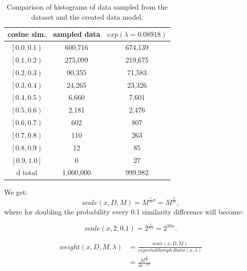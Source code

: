 \begin{table}[!ht]
    \centering
    \begin{tabular}{ c | c | c}
       cosine sim. & sampled data & $exp(\lambda=0.08918)$ \\
        \hline
        $\left[ 0.0, 0.1\right)$ & 600,716 & 674,139 \\
        $\left[ 0.1, 0.2\right)$ & 275,099 & 219,675 \\
        $\left[ 0.2, 0.3\right)$ & 90,355 & 71,583 \\
        $\left[ 0.3, 0.4\right)$ & 24,265 & 23,326 \\
        $\left[ 0.4, 0.5\right)$ & 6,660 & 7,601 \\
        $\left[ 0.5, 0.6\right)$ & 2,181 & 2,476 \\
        $\left[ 0.6, 0.7\right)$ & 602 & 807 \\
        $\left[ 0.7, 0.8\right)$ & 110 & 263 \\
        $\left[ 0.8, 0.9\right)$ & 12 & 85 \\
        $\left[ 0.9, 1.0\right]$ & 0 & 27 \\d
        total & 1,000,000 & 999,982
            
    \end{tabular}
    \caption{Comparison of histograms of data sampled from the dataset and the created data model.}
    \label{table:5.3_modeled_comparison}
\end{table}

We get:
\begin{equation}
    scale(x, D, M) = M^{\frac{1}{D}x} = M^{\frac{x}{D}},
\end{equation}
where for doubling the probability every 0.1 similarity difference will become:

\begin{equation}
    scale(x, 2, 0.1) = 2^{\frac{x}{0.1}} = 2^{10x}.
\end{equation}


\begin{equation}\label{eq:weight}
    \begin{aligned}
        weight(x, D, M, \lambda) &= \frac{scale(x, D, M)}{expectedSampleRatio(x, \lambda)} \\
        & = \frac{M^{\frac{x}{D}}}{\lambda e ^{-\lambda x}}
    \end{aligned}
\end{equation}

